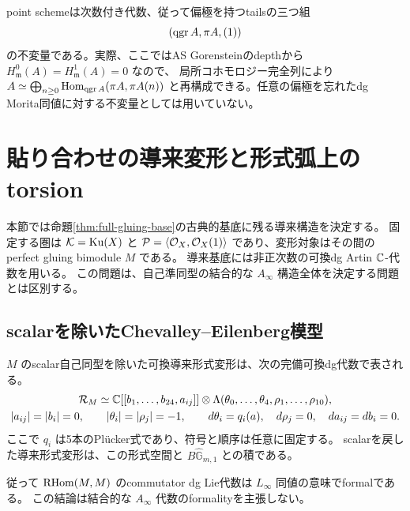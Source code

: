 point schemeは次数付き代数、従って偏極を持つtailsの三つ組
\[
 (\operatorname{qgr} A,\pi A,(1))
\]
の不変量である。実際、ここではAS Gorensteinのdepthから
$H^0_{\mathfrak m}(A)=H^1_{\mathfrak m}(A)=0$ なので、
局所コホモロジー完全列により
$A\simeq\bigoplus_{n\ge0}\operatorname{Hom}_{\operatorname{qgr} A}(\pi A,\pi A(n))$
と再構成できる。任意の偏極を忘れたdg Morita同値に対する不変量としては用いていない。

\section{貼り合わせの導来変形と形式弧上のtorsion}\label{sec:derived-gluing}

本節では命題\ref{thm:full-gluing-base}の古典的基底に残る導来構造を決定する。
固定する圏は $\mathcal K=\operatorname{Ku}(X)$ と
$\mathcal P=\langle\mathcal O_X,\mathcal O_X(1)\rangle$ であり、変形対象はその間の
perfect gluing bimodule $M$ である。
導来基底には非正次数の可換dg Artin $\mathbb C$-代数を用いる。
この問題は、自己準同型の結合的な $A_\infty$ 構造全体を決定する問題とは区別する。

\subsection{scalarを除いたChevalley--Eilenberg模型}

\begin{theorem}[導来形式基底の非標準的な正規形]\label{thm:derived-gluing-normal}
$M$ のscalar自己同型を除いた可換導来形式変形は、次の完備可換dg代数で表される。
\begin{gather}
 \mathcal R_M\simeq
 \mathbb C[[b_1,\ldots,b_{24},a_{ij}]]
 \otimes\Lambda(\theta_0,\ldots,\theta_4,\rho_1,\ldots,\rho_{10}),
 \label{eq:derived-gluing-normal}\\
 |a_{ij}|=|b_i|=0,\qquad |\theta_i|=|\rho_j|=-1,\qquad
 d\theta_i=q_i(a),\quad d\rho_j=0,\quad da_{ij}=db_i=0.
 \nonumber
\end{gather}
ここで $q_i$ は5本のPlücker式であり、符号と順序は任意に固定する。
scalarを戻した導来形式変形は、この形式空間と
$B\widehat{\mathbb G}_{m,1}$ との積である。

従って $\operatorname{RHom}(M,M)$ のcommutator dg Lie代数は
$L_\infty$ 同値の意味でformalである。
この結論は結合的な $A_\infty$ 代数のformalityを主張しない。
\end{theorem}

